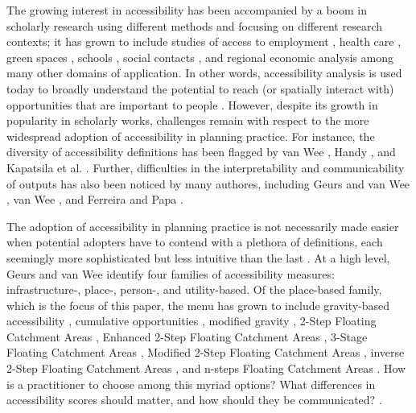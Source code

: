 \documentclass[
  10pt,
  letterpaper,
]{article}
\begin{document}
The growing interest in accessibility has been accompanied by a boom in
scholarly research using different methods and focusing on different
research contexts; it has grown to include studies of access to
employment
\citep[e.g.,][]{karstEvaluationAccessibilityImpacts2003, grengs2010job, paez_jobs_2013, merlin2017competition, tao_investigating_2020},
health care
\citep[e.g.,][]{luo2003, paez_healthcare_2010, wan2012three, delamater2013spatial, boisjoly2017informality, pereira_2021_geographic},
green spaces
\citep{reyesAccessibility2014, rojas_accessibility_2016, liang_novel_2024},
schools
\citep[e.g.,][]{williams_disparities_2014, romanillosAccessibilitySchoolsSpatial2018, marques_accessibility_2021},
social contacts
\citep[e.g.,][]{neutens_human_2007, farberActivitySpacesMeasurement2012, farber_2013_social},
and regional economic analysis
\citep[e.g.,][]{vickermanAccessibility1999, lopezMeasuring2008, ribeiro_road_2010, gutierrez_evaluating_2011}
among many other domains of application. In other words, accessibility
analysis is used today to broadly understand the potential to reach (or
spatially interact with) opportunities that are important to people
\citep{ferreiraReenactingMobilityAccessibility2020}. However, despite
its growth in popularity in scholarly works, challenges remain with
respect to the more widespread adoption of accessibility in planning
practice. For instance, the diversity of accessibility definitions has
been flagged by van Wee \citep{vanweeAccessible2016}, Handy
\citep{handy2020}, and Kapatsila et al.
\citep{kapatsila_resolving_2023}. Further, difficulties in the
interpretability and communicability of outputs has also been noticed by
many authores, including Geurs and van Wee
\citep{geursAccessibilityEvaluationLanduse2004}, van Wee
\citep{vanweeAccessible2016}, and Ferreira and Papa
\citep{ferreiraReenactingMobilityAccessibility2020}.

The adoption of accessibility in planning practice is not necessarily
made easier when potential adopters have to contend with a plethora of
definitions, each seemingly more sophisticated but less intuitive than
the last \citep{kapatsila_resolving_2023}. At a high level, Geurs and
van Wee \citep{geursAccessibilityEvaluationLanduse2004} identify four
families of accessibility measures: infrastructure-, place-, person-,
and utility-based. Of the place-based family, which is the focus of this
paper, the menu has grown to include gravity-based accessibility
\citep[e.g.,][]{hansen1959, pirie_measuring_1979}, cumulative
opportunities
\citep[e.g.,][]{wachs_physical_1973, pirie_measuring_1979, ye_spatial_2018},
modified gravity \citep[e.g.,][]{SchuurmanMeasuring2010}, 2-Step
Floating Catchment Areas \citep[e.g.,][]{luo2003}, Enhanced 2-Step
Floating Catchment Areas \citep[e.g.,][]{luoEnhanced2009}, 3-Stage
Floating Catchment Areas \citep[e.g.,][]{wan2012three}, Modified 2-Step
Floating Catchment Areas \citep[e.g.,][]{delamater2013spatial}, inverse
2-Step Floating Catchment Areas \citep[e.g.,][]{wang_2sfca_2021}, and
n-steps Floating Catchment Areas \citep{liang_novel_2024}. How is a
practitioner to choose among this myriad options? What differences in
accessibility scores should matter, and how should they be communicated?
\citep[see][ p.~14]{vanweeAccessible2016}.
\end{document}
